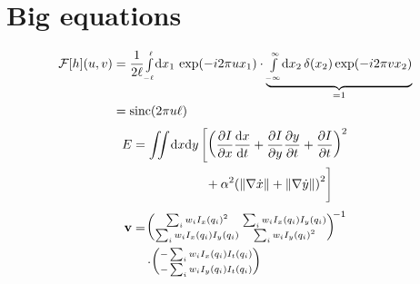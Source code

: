 \appendix
\chapter{Big equations}
\begin{equation}
	\begin{split}
		\mathcal{F}[h](u,v)&=\frac{1}{2\ell}{\scriptstyle\int\limits_{-\ell}^{\ell}}\mathrm d x_1\, \exp\!\left( -i2\pi ux_1 \right)
		\cdot\underbrace{{\scriptstyle\int\limits_{-\infty}^{\infty}}\mathrm d x_2\, \delta(x_2)\exp\!\left( -i2\pi vx_2 \right)}_{=1}\\
		&=\operatorname{sinc}\!\left(2\pi u\ell  \right)
	\end{split}
	\label{eq:motionblur1}
\end{equation}
\begin{equation}
	\begin{split}
		E&=\iint_{}^{}\!\dd{x}\!\dd{y}\left[\left( \pdv{I}{x}\dv{x}{t}+\pdv{I}{y}\pdv{y}{t}+\pdv{I}{t} \right)^2\right.\\
			&\hphantom{\iint_{}^{}\!\dd{x}\!\dd{y}\left[\right.\quad}\left.\vphantom{\iint_{}^{}\!\dd{x}\!\dd{y}\left[\left( \pdv{I}{x}\dv{x}{t}+\pdv{I}{y}\pdv{y}{t}+\pdv{I}{t} \right)^2\right.}
	+\alpha^2\!\left( \norm{\nabla \dot{x}} +\norm{\nabla\dot{y}}\right)^2  \right]
	\end{split}
	\label{eq:2dimstreams}
\end{equation}
\begin{equation}
	\begin{split}
		\vtr{v}&=
		\!{\left(\!\begin{smallmatrix}
			\sum_{i}^{}w_iI_x(q_i)^2&\sum_{i}^{}w_iI_x(q_i)I_y(q_i)\\
			\sum_{i}^{}w_iI_x(q_i)I_y(q_i)&\sum_{i}^{}w_iI_y(q_i)^2
		\end{smallmatrix}\!
	\right)\!}^{-1}\\
	&\quad\cdot 
	\!\left(\!\begin{smallmatrix}
		-\sum_{i}^{}w_iI_x(q_i)I_t(q_i)\\
		-\sum_{i}^{}w_iI_y(q_i)I_t(q_i)
	\end{smallmatrix}\!\right)\!
	\label{eq:lucaskanade2}
	\end{split}
\end{equation}
